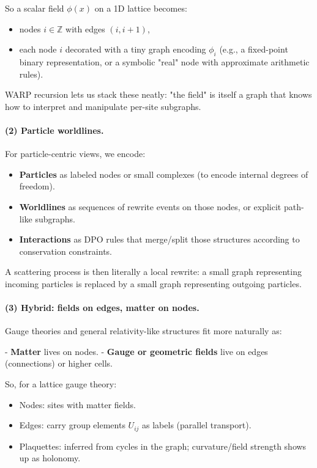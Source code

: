 So a scalar field $\phi(x)$ on a 1D lattice becomes:

\begin{itemize}
  \item nodes $i \in \mathbb{Z}$ with edges $(i,i+1)$,
  \item each node $i$ decorated with a tiny graph encoding $\phi_i$ (e.g., a fixed-point
        binary representation, or a symbolic "real" node with approximate arithmetic rules).
\end{itemize}

WARP recursion lets us stack these neatly: "the field" is itself a graph that
knows how to interpret and manipulate per-site subgraphs.

\paragraph{(2) Particle worldlines.}

For particle-centric views, we encode:

\begin{itemize}
  \item \textbf{Particles} as labeled nodes or small complexes (to encode internal degrees of freedom).
  \item \textbf{Worldlines} as sequences of rewrite events on those nodes, or explicit path-like subgraphs.
  \item \textbf{Interactions} as DPO rules that merge/split those structures according to conservation constraints.
\end{itemize}

A scattering process is then literally a local rewrite: a small graph representing
incoming particles is replaced by a small graph representing outgoing particles.

\paragraph{(3) Hybrid: fields on edges, matter on nodes.}

Gauge theories and general relativity-like structures fit more naturally as:

- \textbf{Matter} lives on nodes.
- \textbf{Gauge or geometric fields} live on edges (connections) or higher cells.

So, for a lattice gauge theory:

\begin{itemize}
  \item Nodes: sites with matter fields.
  \item Edges: carry group elements $U_{ij}$ as labels (parallel transport).
  \item Plaquettes: inferred from cycles in the graph; curvature/field strength shows up as holonomy.
\end{itemize}

